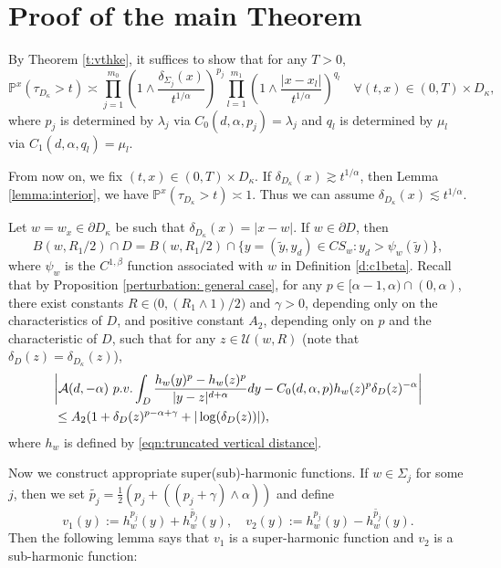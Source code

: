 \documentclass[12pt,a4paper]{amsart}
\numberwithin{equation}{section}
\theoremstyle{plain}
\newcommand{\ga}{\gamma}
\newcommand{\Si}{\Sigma}
\newcommand{\mc}{\mathcal}
\newcommand{\mb}{\mathbb}
\newcommand{\wt}{\widetilde}
\newcommand{\1}{\mathbbm{1}}
\begin{document}
\section{Proof of the main Theorem}
By Theorem \ref{t:vthke}, it suffices to show that for any $T>0$,
\begin{equation}\label{eqn:main target}
 \mb{P}^{x}(\tau_{D_\kappa}>t) \asymp \prod_{j=1}^{m_0} (1\wedge \frac{\delta_{\Si_j}(x)}{t^{1/\alpha}})^{p_j} \prod_{l=1}^{m_1} (1\wedge \frac{|x-x_l|}{t^{1/\alpha}})^{q_l}
\quad \forall (t, x)\in (0, T)\times D_\kappa,  
\end{equation}
where $p_{j}$ is determined  by $\lambda_{j}$ via $C_0(d,\alpha,p_{j}) = \lambda_{j}$ and $q_l$ is determined  by $\mu_{l}$ via $C_1(d,\alpha,q_{l}) = \mu_{l}$.



From now on, we fix $(t, x)\in (0, T)\times D_\kappa$. 
If $\delta_{D_\kappa}(x) \gtrsim t^{1/\alpha}$, then Lemma \ref{lemma:interior}, we have $\mb{P}^{x}(\tau_{D_\kappa}>t) \asymp 1$. 
Thus we can assume $\delta_{D_\kappa}(x) \lesssim t^{1/\alpha}$. 


Let $w = w_x \in \partial D_\kappa$ be such that $\delta_{D_\kappa}(x) = |x - w|$. If $w\in \partial D$, then
\begin{equation} 
B(w,R_1/2) \cap D = B(w, R_1/2)  \cap \{y= (\widetilde{y},y_d) \in CS_w: y_d > \psi_w(\widetilde{y})\},
\end{equation} 
where $\psi_w$ is the $C^{1, \beta}$ function associated with $w$ in Definition \ref{d:c1beta}. 
Recall that by Proposition \ref{perturbation: general case},
for any $p \in [\alpha - 1, \alpha) \cap (0, \alpha)$, there exist constants $R \in \big(0, (R_1 \wedge 1)/2\big)$ and $\ga>0$, 
depending only on the characteristics of $D$, and positive constant $A_2$, depending only on $p$ and the characteristic of $D$, such that for any $z \in \mc U(w,R)$ (note that $\delta_D(z)=\delta_{D_\kappa}(z)$),
\begin{align*}
& \bigg|\mathcal{A}(d,-\alpha){\ \rm p.v.}\int_{D} \frac{h_w(y)^{p}-h_w(z)^{p}}{|y-z|^{d+\alpha}}dy - 
C_0(d,\alpha,p) h_w(z)^p \delta_{D}(z)^{- \alpha}\bigg| \\
&\le A_2(1+ \delta_{D}(z)^{p-\alpha+\gamma} + |\log(\delta_{D}(z))|), 
\end{align*}
where $h_w$ is defined by \eqref{eqn:truncated vertical distance}.

Now we construct appropriate super(sub)-harmonic functions. 
If $w \in \Si_j$ for some $j$, then we 
set $\wt{p_j} =\frac12\left(p_j+((p_j+\gamma)\wedge \alpha )\right)$ and define
\begin{equation}\label{test function: codim 1}
v_1(y):= h_w^{p_j}(y)+h_w^{\wt{p_j}}(y), \quad v_2(y):= h_w^{p_j}(y) - h_w^{\wt{p_j}}(y).
\end{equation}
Then the following lemma says that $v_1$ is a super-harmonic function and $v_2$ is a sub-harmonic function:
\end{document}
